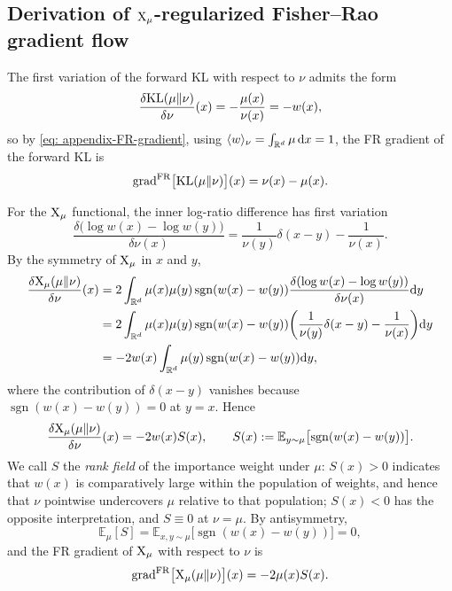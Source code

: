 \documentclass{article}
\begin{document}
\subsection{Derivation of $\mathrm{X}_\mu$-regularized Fisher--Rao gradient flow}
\label{subsec: appendix-FR-grad-calc}

The first variation of the forward KL with respect to $\nu$ admits the form
\begin{equation}
    \frac{\delta \mathrm{KL}(\mu\|\nu)}{\delta \nu}(x) = -\frac{\mu(x)}{\nu(x)} = -w(x),
    \label{eq: appendix-var-KL}
\end{equation}
so by \eqref{eq: appendix-FR-gradient}, using $\langle w \rangle_\nu = \int_{\mathbb R^d} \mu \,\mathrm{d} x = 1$, the FR gradient of the forward KL is
\begin{equation}
    \mathrm{grad}^{\mathrm{FR}}\big[\mathrm{KL}(\mu\|\nu)\big](x) = \nu(x) - \mu(x).
    \label{eq: appendix-FR-grad-KL}
\end{equation}

For the $\mathrm{X}_\mu$ functional, the inner log-ratio difference has first variation
\begin{equation*}
    \frac{\delta\bigl(\log w(x) - \log w(y)\bigr)}{\delta\nu(x)} = \frac{1}{\nu(y)}\delta(x-y) - \frac{1}{\nu(x)}.
\end{equation*}
By the symmetry of $\mathrm{X}_\mu$ in $x$ and $y$,
\begin{align*}
    \frac{\delta \mathrm{X}_\mu(\mu\|\nu)}{\delta \nu}(x) & =
    2 \int_{\mathbb R^d} \mu(x) \mu(y) \operatorname{sgn}(w(x) - w(y)) \frac{\delta (\log w(x) - \log w(y))}{\delta\nu(x)} \mathrm{d} y \\
    & = 2 \int_{\mathbb R^d} \mu(x) \mu(y) \operatorname{sgn}(w(x) - w(y))
    \bigg(\frac1{\nu(y)}\delta(x-y) - \frac1{\nu(x)}\bigg) \mathrm{d} y \\
    & = -2 w(x) \int_{\mathbb R^d} \mu(y) \operatorname{sgn}(w(x) - w(y))  \mathrm{d} y,
\end{align*}
where the contribution of $\delta(x-y)$ vanishes because $\operatorname{sgn}(w(x) - w(y)) = 0$ at $y = x$. Hence
\begin{equation}
    \frac{\delta \mathrm{X}_\mu(\mu\|\nu)}{\delta \nu}(x) = - 2w(x)S(x),
    \qquad
    S(x) := \mathbb E_{y\sim\mu}\bigl[\operatorname{sgn}(w(x) - w(y))\bigr].
    \label{eq: appendix-var-X}
\end{equation}
We call $S$ the \emph{rank field} of the importance weight under $\mu$: $S(x) > 0$ indicates that $w(x)$ is comparatively large within the population of weights, and hence that $\nu$ pointwise undercovers $\mu$ relative to that population; $S(x) < 0$ has the opposite interpretation, and $S \equiv 0$ at $\nu = \mu$. By antisymmetry,
\begin{equation*}
    \mathbb E_\mu[S] = \mathbb E_{x,y\sim \mu}\bigl[\operatorname{sgn}(w(x) - w(y))\bigr] = 0,
\end{equation*}
and the FR gradient of $\mathrm{X}_\mu$ with respect to $\nu$ is
\begin{equation}
    \mathrm{grad}^{\mathrm{FR}}\big[\mathrm{X}_\mu(\mu\|\nu)\big](x) = -2\mu(x) S(x).
    \label{eq: appendix-FR-grad-X}
\end{equation}
\end{document}
